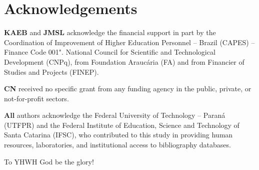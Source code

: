 \section*{Acknowledgements}

    \textbf{KAEB}  and  \textbf{JMSL}  acknowledge  the  financial  support  in  part   by   the
    Coordination of Improvement of Higher Education Personnel -- Brazil (CAPES) -- Finance  Code
    001". National Council for Scientific and Technological Development (CNPq), from  Foundation
    Araucária (FA) and from Financier of Studies and Projects (FINEP).

    \textbf{CN} received no specific grant from any funding agency in the  public,  private,  or
    not-for-profit sectors.

    \textbf{All} authors acknowledge the Federal University of Technology -- Paraná (UTFPR)  and
    the Federal Institute of Education, Science and Technology of  Santa  Catarina  (IFSC),  who
    contributed to this study in providing  human  resources,  laboratories,  and  institutional
    access to bibliography databases.

    To YHWH God be the glory!


